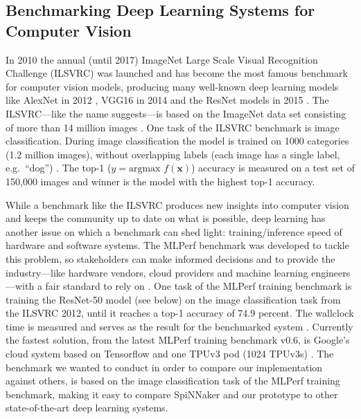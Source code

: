 \documentclass[]{article}
\begin{document}


\subsection{Benchmarking Deep Learning Systems for Computer Vision} %
\label{subsec:intro_bench}

In 2010 the annual (until 2017) ImageNet Large Scale Visual
Recognition Challenge (ILSVRC) was launched and has become the most
famous benchmark for computer vision models, producing many well-known
deep learning models like AlexNet in 2012
\citep{krizhevsky_et_al_2012}, VGG16 in 2014
\citep{simonyan_et_al_2014} and the ResNet models in 2015
\citep{he_et_al_2015}.
The ILSVRC---like the name suggests---is based on the ImageNet data
set consisting of more than 14 million images
\citep{russakovsky_et_al_2015}.
One task of the ILSVRC benchmark is image classification.
During image classification the model is trained on 1000 categories
(1.2 million images), without overlapping labels (each image has a
single label, e.g.~``dog'') \citep{russakovsky_et_al_2015}.
The top-1 ($y = \text{argmax } f(\mathbf{x})$) accuracy is measured on
a test set of 150,000 images and winner is the model with the highest
top-1 accuracy.

While a benchmark like the ILSVRC produces new insights into computer
vision and keeps the community up to date on what is possible,
deep learning has another issue on which a benchmark can shed light:
training/inference speed of hardware and software systems.
The MLPerf benchmark was developed to tackle this problem, so
stakeholders can make informed decisions and to provide the
industry---like hardware vendors, cloud providers and machine learning
engineers---with a fair standard to rely on
\citep{mattson_et_al_2019}.
One task of the MLPerf training benchmark is training the ResNet-50
model (see below) on the image classification task from the ILSVRC
2012, until it reaches a top-1 accuracy of 74.9 percent.
The wallclock time is measured and serves as the result for the
benchmarked system \citep{mattson_et_al_2019}.
Currently the fastest solution, from the latest MLPerf training
benchmark v0.6, is Google's cloud system based on Tensorflow and
one TPUv3 pod (1024 TPUv3s) \citep{mlperf_2019, stone_2019}.
The benchmark we wanted to conduct in order to compare our
implementation against others, is based
on the image classification task of the MLPerf training benchmark,
making it easy to compare SpiNNaker and our prototype to other
state-of-the-art deep learning systems.
\end{document}
